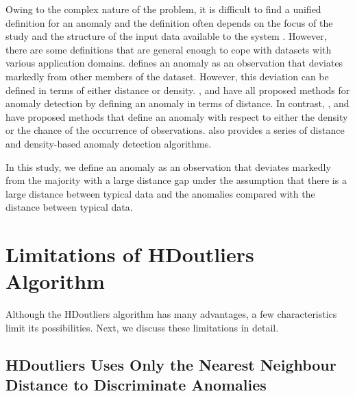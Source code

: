 \documentclass[11pt,a4paper,]{article}
\theoremstyle{definition}
\theoremstyle{definition}
\theoremstyle{definition}
\theoremstyle{remark}
\begin{document}
Owing to the complex nature of the problem, it is difficult to find a unified definition for an anomaly and the definition often depends on the focus of the study and the structure of the input data available to the system \autocite{williams2016local,unwin2019multivariate}. However, there are some definitions that are general enough to cope with datasets with various application domains. \textcite{grubbs1969procedures} defines an anomaly as an observation that deviates markedly from other members of the dataset. However, this deviation can be defined in terms of either distance or density. \textcite{burridge2006additive}, \textcite{wilkinson2017visualizing} and \textcite{schwarz2008wind} have all proposed methods for anomaly detection by defining an anomaly in terms of distance. In contrast, \textcite{hyndman1996computing}, \textcite{clifton2011novelty} and \textcite{talagala2019anomaly} have proposed methods that define an anomaly with respect to either the density or the chance of the occurrence of observations. \textcite{madsen2018ddoutlier} also provides a series of distance and density-based anomaly detection algorithms.

In this study, we define an anomaly as an observation that deviates markedly from the majority with a large distance gap under the assumption that there is a large distance between typical data and the anomalies compared with the distance between typical data.

\hypertarget{limitations-of-hdoutliers-algorithm}{%
\section{Limitations of HDoutliers Algorithm}\label{limitations-of-hdoutliers-algorithm}}

\label{sec:limitations_HD}

Although the HDoutliers algorithm \autocite{wilkinson2017visualizing} has many advantages, a few characteristics limit its possibilities. Next, we discuss these limitations in detail.

\hypertarget{hdoutliers-uses-only-the-nearest-neighbour-distance-to-discriminate-anomalies}{%
\subsection{HDoutliers Uses Only the Nearest Neighbour Distance to Discriminate Anomalies}\label{hdoutliers-uses-only-the-nearest-neighbour-distance-to-discriminate-anomalies}}

\label{sec:NN_FR}
\end{document}
